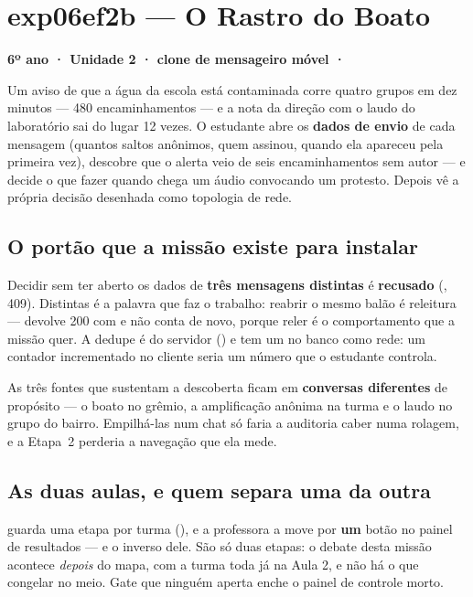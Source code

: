 \section{exp06ef2b --- O Rastro do Boato}
\label{sec:exp06ef2b}

\textbf{6º ano · Unidade 2 · clone de mensageiro móvel · }

Um aviso de que a água da escola está contaminada corre quatro grupos em dez
minutos --- 480 encaminhamentos --- e a nota da direção com o laudo do
laboratório sai do lugar 12 vezes. O estudante abre os \textbf{dados de envio}
de cada mensagem (quantos saltos anônimos, quem assinou, quando ela apareceu
pela primeira vez), descobre que o alerta veio de seis encaminhamentos sem autor
--- e decide o que fazer quando chega um áudio convocando um protesto. Depois vê
a própria decisão desenhada como topologia de rede.

\subsection{O portão que a missão existe para instalar}

Decidir sem ter aberto os dados de \textbf{três mensagens distintas} é
\textbf{recusado} (, 409). Distintas é a palavra que
faz o trabalho: reabrir o mesmo balão é releitura --- devolve 200 com
 e não conta de novo, porque reler é o comportamento que a
missão quer. A dedupe é do servidor () e tem um
 no banco como rede: um contador incrementado no cliente seria um
número que o estudante controla.

As três fontes que sustentam a descoberta ficam em \textbf{conversas
diferentes} de propósito --- o boato no grêmio, a amplificação anônima na turma
e o laudo no grupo do bairro. Empilhá-las num chat só faria a auditoria caber
numa rolagem, e a Etapa~2 perderia a navegação que ela mede.

\subsection{As duas aulas, e quem separa uma da outra}

 guarda uma etapa por turma
(), e a professora a move por \textbf{um} botão no painel de
resultados --- e o inverso dele. São só duas etapas: o
debate desta missão acontece \emph{depois} do mapa, com a turma toda já na Aula
2, e não há o que congelar no meio. Gate que ninguém aperta enche o painel de
controle morto.

